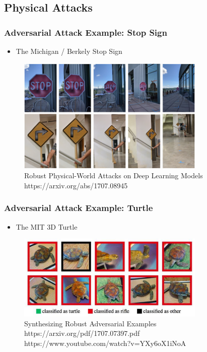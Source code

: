 \documentclass[9pt,dvipsnames]{beamer}
\begin{document}
\subsection{Physical Attacks}
\begin{frame}
	\frametitle{Adversarial Attack Example: Stop Sign}
	\begin{itemize}
		\item The Michigan / Berkely Stop Sign
	\end{itemize}
	\begin{figure}[htbp]
		\centering
		\includegraphics[width=0.8\textwidth]{imgs/adv_overview_6.png}
		\caption{Robust Physical-World Attacks on Deep Learning Models https://arxiv.org/abs/1707.08945}
	\end{figure}
\end{frame}

\begin{frame}
	\frametitle{Adversarial Attack Example: Turtle}
	\begin{itemize}
		\item The MIT 3D Turtle
	\end{itemize}
	\begin{figure}[htbp]
		\centering
		\includegraphics[width=0.8\textwidth]{imgs/adv_overview_7.png}
		\caption{Synthesizing Robust Adversarial Examples https://arxiv.org/pdf/1707.07397.pdf https://www.youtube.com/watch?v=YXy6oX1iNoA}
	\end{figure}
	
\end{frame}
\end{document}
